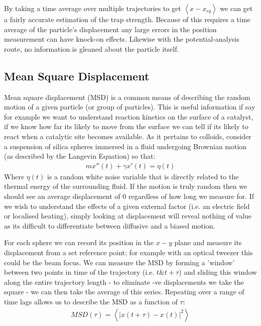 \documentclass[a4paper,oneside,11pt]{book}
\begin{document}
By taking a time average over multiple trajectories to get $\left<x-x_{eq}\right>$ we can get a fairly accurate estimation of the trap strength. Because of this requires a time average of the particle's displacement any large errors in the position measurement can have knock-on effects. Likewise with the potential-analysis route, no information is gleaned about the particle itself.

\subsection{Mean Square Displacement}
Mean square displacement (MSD) is a common means of describing the random motion of a given particle (or group of particles). This is useful information if say for example we want to understand reaction kinetics on the surface of a catalyst, if we know how far its likely to move from the surface we can tell if its likely to react when a catalytic site becomes available. As it pertains to colloids, consider a suspension of silica spheres immersed in a fluid undergoing Brownian motion (as described by the Langevin Equation) so that:
\begin{align}
	mx''(t) + \gamma x'(t) = \eta(t)
\end{align}
Where $\eta(t)$ is a random white noise variable that is directly related to the thermal energy of the surrounding fluid. If the motion is truly random then we should see an average displacement of 0 regardless of how long we measure for. If we wish to understand the effects of a given external factor (i.e. an electric field or localised heating), simply looking at displacement will reveal nothing of value as its difficult to differentiate between diffusive and a biased motion. 

For each sphere we can record its position in the $x-y$ plane and measure its displacement from a set reference point; for example with an optical tweezer this could be the beam focus. We can measure the MSD by forming a 'window' between two points in time of the trajectory (i.e. $t \&  t+\tau$) and sliding this window along the entire trajectory length - to eliminate -ve displacements we take the square - we can then take the average of this series. Repeating over a range of time lags allows us to describe the MSD as a function of $\tau$:
\begin{align}
	MSD(\tau) = \left<|x(t+\tau) - x(t)|^2\right>
\end{align}
\end{document}

